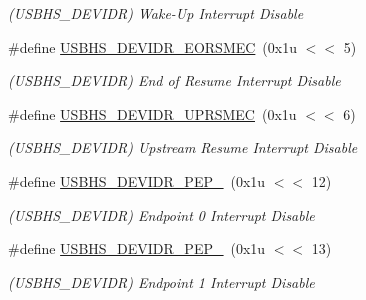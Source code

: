 \begin{DoxyCompactItemize}
\begin{DoxyCompactList}\small\item\em (U\+S\+B\+H\+S\+\_\+\+D\+E\+V\+I\+DR) Wake-\/\+Up Interrupt Disable \end{DoxyCompactList}\item 
\mbox{\label{group__SAMS70__USBHS_ga70444ef92493dfca180499e8510b2fc7}} 
\#define \mbox{\hyperlink{group__SAMS70__USBHS_ga70444ef92493dfca180499e8510b2fc7}{U\+S\+B\+H\+S\+\_\+\+D\+E\+V\+I\+D\+R\+\_\+\+E\+O\+R\+S\+M\+EC}}~(0x1u $<$$<$ 5)
\begin{DoxyCompactList}\small\item\em (U\+S\+B\+H\+S\+\_\+\+D\+E\+V\+I\+DR) End of Resume Interrupt Disable \end{DoxyCompactList}\item 
\mbox{\label{group__SAMS70__USBHS_ga09aec79ff3dfda039ef5686ca7d1eaa3}} 
\#define \mbox{\hyperlink{group__SAMS70__USBHS_ga09aec79ff3dfda039ef5686ca7d1eaa3}{U\+S\+B\+H\+S\+\_\+\+D\+E\+V\+I\+D\+R\+\_\+\+U\+P\+R\+S\+M\+EC}}~(0x1u $<$$<$ 6)
\begin{DoxyCompactList}\small\item\em (U\+S\+B\+H\+S\+\_\+\+D\+E\+V\+I\+DR) Upstream Resume Interrupt Disable \end{DoxyCompactList}\item 
\mbox{\label{group__SAMS70__USBHS_ga4d786bb6a453f549dee7c43ca99e73a1}} 
\#define \mbox{\hyperlink{group__SAMS70__USBHS_ga4d786bb6a453f549dee7c43ca99e73a1}{U\+S\+B\+H\+S\+\_\+\+D\+E\+V\+I\+D\+R\+\_\+\+P\+E\+P\+\_}}~(0x1u $<$$<$ 12)
\begin{DoxyCompactList}\small\item\em (U\+S\+B\+H\+S\+\_\+\+D\+E\+V\+I\+DR) Endpoint 0 Interrupt Disable \end{DoxyCompactList}\item 
\mbox{\label{group__SAMS70__USBHS_ga0d895e9bfbc5570ddca744f009cd5fc7}} 
\#define \mbox{\hyperlink{group__SAMS70__USBHS_ga0d895e9bfbc5570ddca744f009cd5fc7}{U\+S\+B\+H\+S\+\_\+\+D\+E\+V\+I\+D\+R\+\_\+\+P\+E\+P\+\_}}~(0x1u $<$$<$ 13)
\begin{DoxyCompactList}\small\item\em (U\+S\+B\+H\+S\+\_\+\+D\+E\+V\+I\+DR) Endpoint 1 Interrupt Disable \end{DoxyCompactList}\item 

\end{DoxyCompactItemize}
